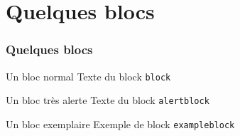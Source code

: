 \section{Quelques blocs}
\begin{frame}
\frametitle{Quelques blocs}

\begin{block}{Un bloc normal}
  Texte du block \texttt{block}
 \end{block}

 \begin{alertblock}{Un bloc très alerte}
  Texte du block \texttt{alertblock}
 \end{alertblock}

 \begin{exampleblock}{Un bloc exemplaire}
  Exemple de block \texttt{exampleblock}
 \end{exampleblock}

\end{frame}
